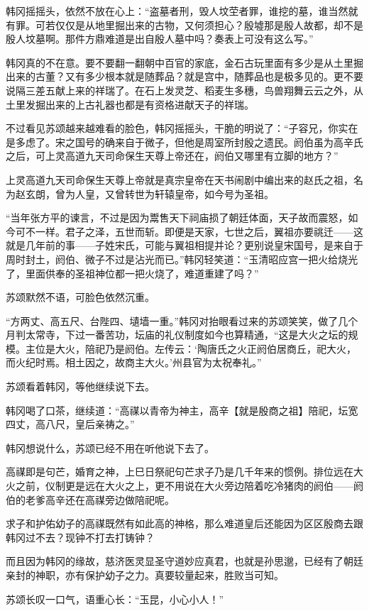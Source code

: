 韩冈摇摇头，依然不放在心上：“盗墓者刑，毁人坟茔者罪，谁挖的墓，谁当然就有罪。可若仅仅是从地里掘出来的古物，又何须担心？殷墟那是殷人故都，却不是殷人坟墓啊。那件方鼎难道是出自殷人墓中吗？奏表上可没有这么写。”

韩冈真的不在意。要不要翻一翻朝中百官的家底，金石古玩里面有多少是从土里掘出来的古董？又有多少根本就是随葬品？就是宫中，随葬品也是极多见的。更不要说隔三差五献上来的祥瑞了。在石上发灵芝、稻麦生多穗，鸟兽翔舞云云之外，从土里发掘出来的上古礼器也都是有资格进献天子的祥瑞。

不过看见苏颂越来越难看的脸色，韩冈摇摇头，干脆的明说了：“子容兄，你实在是多虑了。宋之国号的确来自于微子，但他是周室所封殷之遗民。阏伯虽为高辛氏之后，可上灵高道九天司命保生天尊上帝还在，阏伯又哪里有立脚的地方？”

上灵高道九天司命保生天尊上帝就是真宗皇帝在天书闹剧中编出来的赵氏之祖，名为赵玄朗，曾为人皇，又曾转世为轩辕皇帝，如今号为圣祖。

“当年张方平的谏言，不过是因为鬻售天下祠庙损了朝廷体面，天子故而震怒，如今可不一样。君子之泽，五世而斩。即便是天家，七世之后，翼祖亦要祧迁——这就是几年前的事——子姓宋氏，可能与翼祖相提并论？更别说皇宋国号，是来自于周时封土，阏伯、微子不过是沾光而已。”韩冈轻笑道：“玉清昭应宫一把火给烧光了，里面供奉的圣祖神位都一把火烧了，难道重建了吗？”

苏颂默然不语，可脸色依然沉重。

“方两丈、高五尺、台陛四、壝墙一重。”韩冈对抬眼看过来的苏颂笑笑，做了几个月判太常寺，下过一番苦功，坛庙的礼仪制度如今也算精通，“这是大火之坛的规模。主位是大火，陪祀乃是阏伯。左传云：‘陶唐氏之火正阏伯居商丘，祀大火，而火纪时焉。相土因之，故商主大火。’州县官为太祝奉礼。”

苏颂看着韩冈，等他继续说下去。

韩冈喝了口茶，继续道：“高禖以青帝为神主，高辛【就是殷商之祖】陪祀，坛宽四丈，高八尺，皇后亲祷之。”

韩冈想说什么，苏颂已经不用在听他说下去了。

高禖即是句芒，婚育之神，上巳日祭祀句芒求子乃是几千年来的惯例。排位远在大火之前，仪制更是远在大火之上，更不用说在大火旁边陪着吃冷猪肉的阏伯——阏伯的老爹高辛还在高禖旁边做陪祀呢。

求子和护佑幼子的高禖既然有如此高的神格，那么难道皇后还能因为区区殷商去跟韩冈过不去？现钟不打去打铸钟？

而且因为韩冈的缘故，慈济医灵显圣守道妙应真君，也就是孙思邈，已经有了朝廷亲封的神职，亦有保护幼子之力。真要较量起来，胜败当可知。

苏颂长叹一口气，语重心长：“玉昆，小心小人！”

